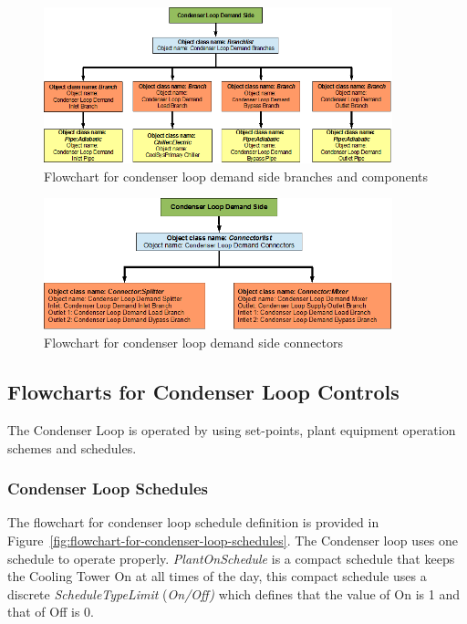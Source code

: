 \begin{figure}[hbtp] %
\centering
\includegraphics[width=0.9\textwidth, height=0.9\textheight, keepaspectratio=true]{media/image068.png}
\caption{Flowchart for condenser loop demand side branches and components \protect \label{fig:flowchart-for-condenser-loop-demand-side-branches-and}}
\end{figure}

\begin{figure}[hbtp] %
\centering
\includegraphics[width=0.9\textwidth, height=0.9\textheight, keepaspectratio=true]{media/image069.png}
\caption{Flowchart for condenser loop demand side connectors \protect \label{fig:flowchart-for-condenser-loop-demand-side-connectors}}
\end{figure}

\subsection{Flowcharts for Condenser Loop Controls}\label{flowcharts-for-condenser-loop-controls}

The Condenser Loop is operated by using set-points, plant equipment operation schemes and schedules.

\subsubsection{Condenser Loop Schedules}\label{condenser-loop-schedules}

The flowchart for condenser loop schedule definition is provided in Figure~\ref{fig:flowchart-for-condenser-loop-schedules}. The Condenser loop uses one schedule to operate properly. \emph{PlantOnSchedule} is a compact schedule that keeps the Cooling Tower On at all times of the day, this compact schedule uses a discrete \emph{ScheduleTypeLimit} (\emph{On/Off)} which defines that the value of On is 1 and that of Off is 0.

